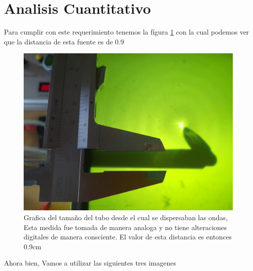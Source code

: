 \documentclass[a4paper, amsfonts, amssymb, amsmath, reprint, showkeys, nofootinbib, twoside]{revtex4-1}
\begin{document}
\section{Analisis Cuantitativo}
Para cumplir con este requerimiento tenemos la fígura \ref{fig:tubito} con la cual podemos ver que la distancia de esta fuente es de 0.9
        \begin{figure}[h]
          \centering
          \includegraphics[scale=0.1]{tubito.jpeg}
          \caption{Grafica del tamaño del tubo desde el cual se dispersaban las ondas, Esta medida fue tomada de manera analoga y no tiene alteraciones digitales de manera consciente. El valor de esta distancia es entonces 0.9cm}\label{fig:tubito}
        \end{figure}
        Ahora bien, Vamos a utilizar las siguientes tres imagenes
\end{document}
